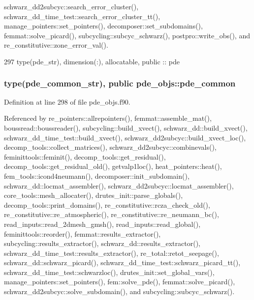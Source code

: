 schwarz\+\_\+dd2subcyc\+::search\+\_\+error\+\_\+cluster(), schwarz\+\_\+dd\+\_\+time\+\_\+test\+::search\+\_\+error\+\_\+cluster\+\_\+tt(), manage\+\_\+pointers\+::set\+\_\+pointers(), decomposer\+::set\+\_\+subdomains(), femmat\+::solve\+\_\+picard(), subcycling\+::subcyc\+\_\+schwarz(), postpro\+::write\+\_\+obs(), and re\+\_\+constitutive\+::zone\+\_\+error\+\_\+val().


\begin{DoxyCode}
297   \textcolor{keywordtype}{type}(pde_str), \textcolor{keywordtype}{dimension(:)}, \textcolor{keywordtype}{allocatable},  \textcolor{keywordtype}{public} :: pde
\end{DoxyCode}
\subsubsection[{pde\+\_\+common}]{\setlength{\rightskip}{0pt plus 5cm}type({\bf pde\+\_\+common\+\_\+str}), public pde\+\_\+objs\+::pde\+\_\+common}\label{namespacepde__objs_a177df2f43aeb5ecde4cca531ecfbf4a1}


Definition at line 298 of file pde\+\_\+objs.\+f90.



Referenced by re\+\_\+pointers\+::allrepointers(), femmat\+::assemble\+\_\+mat(), boussread\+::boussreader(), subcycling\+::build\+\_\+xvect(), schwarz\+\_\+dd\+::build\+\_\+xvect(), schwarz\+\_\+dd\+\_\+time\+\_\+test\+::build\+\_\+xvect(), schwarz\+\_\+dd2subcyc\+::build\+\_\+xvect\+\_\+loc(), decomp\+\_\+tools\+::collect\+\_\+matrices(), schwarz\+\_\+dd2subcyc\+::combinevals(), feminittools\+::feminit(), decomp\+\_\+tools\+::get\+\_\+residual(), decomp\+\_\+tools\+::get\+\_\+residual\+\_\+old(), getvalp1loc(), heat\+\_\+pointers\+::heat(), fem\+\_\+tools\+::icond4neumann(), decomposer\+::init\+\_\+subdomain(), schwarz\+\_\+dd\+::locmat\+\_\+assembler(), schwarz\+\_\+dd2subcyc\+::locmat\+\_\+assembler(), core\+\_\+tools\+::mesh\+\_\+allocater(), drutes\+\_\+init\+::parse\+\_\+globals(), decomp\+\_\+tools\+::print\+\_\+domains(), re\+\_\+constitutive\+::rcza\+\_\+check\+\_\+old(), re\+\_\+constitutive\+::re\+\_\+atmospheric(), re\+\_\+constitutive\+::re\+\_\+neumann\+\_\+bc(), read\+\_\+inputs\+::read\+\_\+2dmesh\+\_\+gmsh(), read\+\_\+inputs\+::read\+\_\+global(), feminittools\+::reorder(), femmat\+::results\+\_\+extractor(), subcycling\+::results\+\_\+extractor(), schwarz\+\_\+dd\+::results\+\_\+extractor(), schwarz\+\_\+dd\+\_\+time\+\_\+test\+::results\+\_\+extractor(), re\+\_\+total\+::retot\+\_\+seepage(), schwarz\+\_\+dd\+::schwarz\+\_\+picard(), schwarz\+\_\+dd\+\_\+time\+\_\+test\+::schwarz\+\_\+picard\+\_\+tt(), schwarz\+\_\+dd\+\_\+time\+\_\+test\+::schwarzloc(), drutes\+\_\+init\+::set\+\_\+global\+\_\+vars(), manage\+\_\+pointers\+::set\+\_\+pointers(), fem\+::solve\+\_\+pde(), femmat\+::solve\+\_\+picard(), schwarz\+\_\+dd2subcyc\+::solve\+\_\+subdomain(), and subcycling\+::subcyc\+\_\+schwarz().


